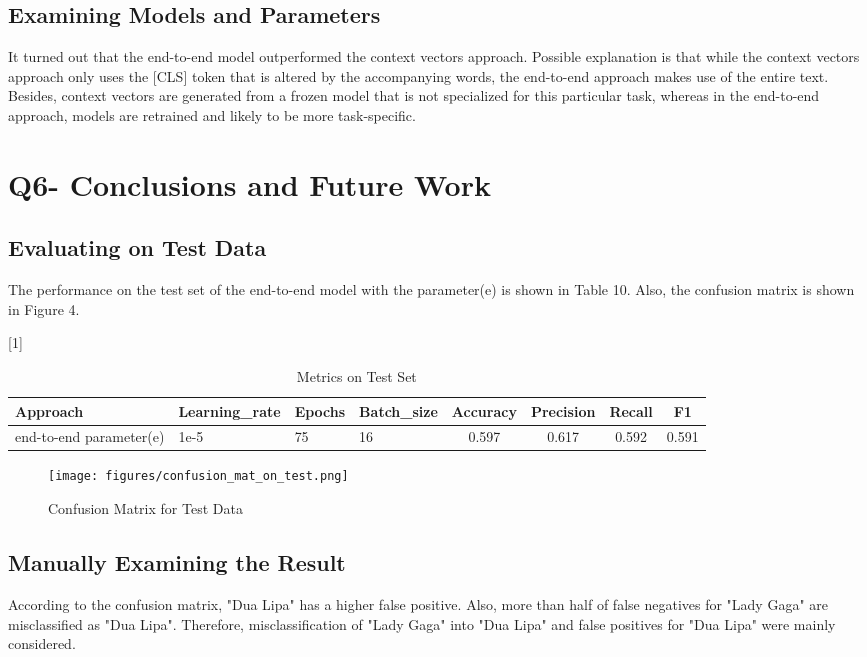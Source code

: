 \documentclass[a4paper,11pt]{article}
\begin{document}
\subsection{Examining Models and Parameters}
It turned out that the end-to-end model outperformed the context vectors approach.
Possible explanation is  that while the context vectors approach only uses the [CLS] token that is altered by the accompanying words,
the end-to-end approach makes use of the entire text.
Besides, context vectors are generated from a frozen model that is not specialized for this particular task,
whereas in the end-to-end approach, models are retrained and likely to be more task-specific.


\section{Q6- Conclusions and Future Work}
\subsection{Evaluating on Test Data}
The performance on the test set of the end-to-end model with the parameter(e) is shown in Table 10.
Also, the confusion matrix is shown in Figure 4.
\begin{table}[htbp]
    \centering
    \caption{Metrics on Test Set}
    \small
    \scalebox{1}[1]{
    \begin{tabular}{l|lll|cccc}
         Approach & Learning\_rate & Epochs & Batch\_size & Accuracy & Precision & Recall & F1 \\ \hline 
         end-to-end parameter(e)                  & 1e-5& 75& 16  & 0.597 & 0.617 & 0.592  & 0.591 \\
    \end{tabular}
    }
\end{table}

\begin{figure}[H]
  \begin{center}
  \texttt{[image: figures/confusion\_mat\_on\_test.png]}
  \caption{Confusion Matrix for Test Data}
  \end{center}
\end{figure}

\subsection{Manually Examining the Result}
According to the confusion matrix, "Dua Lipa" has a higher false positive.
Also, more than half of false negatives for "Lady Gaga" are misclassified as "Dua Lipa".
Therefore, misclassification of "Lady Gaga" into "Dua Lipa" and false positives for "Dua Lipa" were mainly considered.
\end{document}
